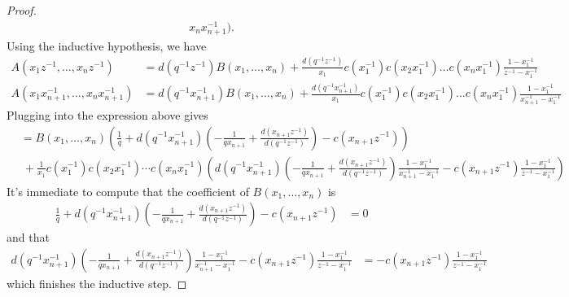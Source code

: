 \documentclass{amsart}
\theoremstyle{definition}
\begin{document}
{\begin{proof}
\begin{align*}
                x_nx_{n+1}^{-1}).
\end{align*}
Using the inductive hypothesis, we have
\begin{align*}
A(x_1z^{-1},\ldots,x_nz^{-1})&=d(q^{-1}z^{-1})B(x_1,\ldots,x_n)+\frac{d(q^{-1}z^{-1})}{x_1}c(x_1^{-1})c(x_2x_1^{-1})\ldots c(x_nx_1^{-1})\frac{1-x_1^{-1}}{z^{-1}-x_1^{-1}}\\
A(x_1x_{n+1}^{-1},\ldots,x_nx_{n+1}^{-1})&=d(q^{-1}x_{n+1}^{-1})B(x_1,\ldots,x_n)+\frac{d(q^{-1}x_{n+1}^{-1})}{x_1}c(x_1^{-1})c(x_2x_1^{-1})\ldots c(x_nx_1^{-1})\frac{1-x_1^{-1}}{x_{n+1}^{-1}-x_1^{-1}}
\end{align*}
Plugging into the expression above gives
\begin{align*}
  &=B(x_1,\ldots,x_n)\left(\frac{1}{q}+d(q^{-1}x_{n+1}^{-1})\left(-\frac{1}{qx_{n+1}}+\frac{d(x_{n+1}z^{-1})}{d(q^{-1}z^{-1})}\right)-c(x_{n+1}z^{-1})\right)\\
  &\ +\frac{1}{x_1}c(x_1^{-1})c(x_2x_1^{-1})\cdots c(x_nx_1^{-1})\left(d(q^{-1}x_{n+1}^{-1})\left(-\frac{1}{qx_{n+1}}+\frac{d(x_{n+1}z^{-1})}{d(q^{-1}z^{-1})}\right)\frac{1-x_1^{-1}}{x_{n+1}^{-1}-x_1^{-1}}-c(x_{n+1}z^{-1})\frac{1-x_1^{-1}}{z^{-1}-x_1^{-1}}\right)
\end{align*}
It's immediate to compute that the coefficient of $B(x_1,\ldots,
x_n)$ is
\begin{align*}
\frac{1}{q}+d(q^{-1}x_{n+1}^{-1})\left(-\frac{1}{qx_{n+1}}+\frac{d(x_{n+1}z^{-1})}{d(q^{-1}z^{-1})}\right)-c(x_{n+1}z^{-1})&=0
\end{align*}
and that
\begin{align*}
d(q^{-1}x_{n+1}^{-1})\left(-\frac{1}{qx_{n+1}}+\frac{d(x_{n+1}z^{-1})}{d(q^{-1}z^{-1})}\right)\frac{1-x_1^{-1}}{x_{n+1}^{-1}-x_1^{-1}}-c(x_{n+1}z^{-1})\frac{1-x_1^{-1}}{z^{-1}-x_1^{-1}}&=-c(x_{n+1}z^{-1})\frac{1-x_1^{-1}}{z^{-1}-x_1^{-1}}
\end{align*}
which finishes the inductive step.


\end{proof}}
\end{document}
